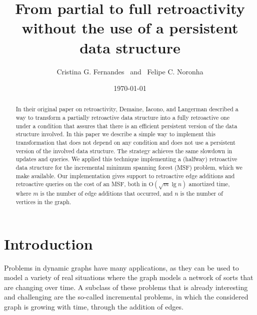 \documentclass[reqno,11pt]{amsart}
\newcommand{\Oh}{\mathrm{O}}
\begin{document}
\title[From partial to full retroactivity without persistence]
{From partial to full retroactivity without the use of a persistent data structure}

\author{Cristina G. Fernandes \ and \ Felipe C. Noronha}

\address{Department of Computer Science, University of São Paulo, Brazil}

\date{\today}

\begin{abstract}
In their original paper on retroactivity, Demaine, Iacono, and Langerman described 
a way to transform a partially retroactive data structure into a fully retroactive 
one under a condition that assures that there is an efficient persistent version 
of the data structure involved.  In this paper we describe a simple way to implement 
this transformation that does not depend on any condition and does not use a 
persistent version of the involved data structure.  The strategy achieves the 
same slowdown in updates and queries.  We applied this technique implementing a (halfway) 
retroactive data structure for the incremental minimum spanning forest (MSF) problem,
which we make available.  Our implementation gives support to retroactive edge additions 
and retroactive queries on the cost of an MSF, both in $\Oh(\sqrt{m}\lg n)$ amortized time, 
where $m$ is the number of edge additions that occurred, and $n$ is the number of 
vertices in the graph.
\end{abstract}


\maketitle

\section{Introduction}

Problems in dynamic graphs have many applications, as they can be used to model a variety 
of real situations where the graph models a network of sorts that are changing over time. 
A subclass of these problems that is already interesting and challenging are the so-called 
incremental problems, in which the considered graph is growing with time, through the 
addition of edges.  
\end{document}
